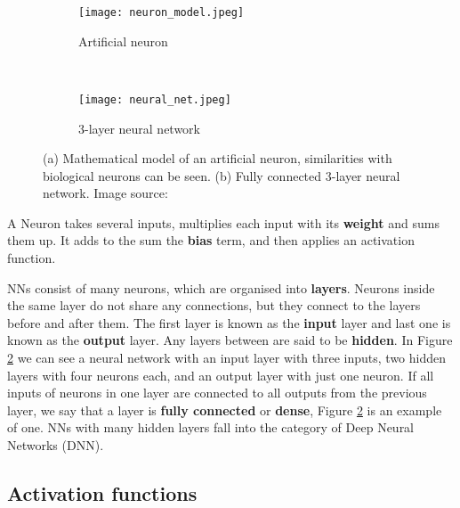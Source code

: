 \begin{figure}[ht] 
    \begin{subfigure}[b]{0.5\textwidth}
        \centering
        \texttt{[image: neuron\_model.jpeg]} 
        \caption{Artificial neuron}
        \label{neuron_model}
    \end{subfigure}
    \unskip\ \vrule\ 
    \begin{subfigure}[b]{0.5\textwidth}
        \centering
        \texttt{[image: neural\_net.jpeg]} 
        \caption{ 3-layer neural network}
        \label{neural_net}
    \end{subfigure}
    
    \caption[Mathematical model of artificial neuron and fully connected 3-layer neural network.]{(a) Mathematical model of an artificial neuron, similarities with biological neurons can be seen. (b) Fully connected 3-layer neural network. Image source: \cite{cs231n}}
    \label{neural}
\end{figure}

A Neuron takes several inputs, multiplies each input with its \textbf{weight} and sums them up.
It adds to the sum the \textbf{bias} term, and then applies an activation function.

NNs consist of many neurons, which are organised into \textbf{layers}.
Neurons inside the same layer do not share any connections, but they connect to the layers before and after them.
The first layer is known as the \textbf{input} layer and last one is known as the \textbf{output} layer. 
Any layers between are said to be \textbf{hidden}. 
In Figure \ref{neural_net} we can see a neural network with an input layer with three inputs, two hidden layers with four neurons each, and an output layer with just one neuron.
If all inputs of neurons in one layer are connected to all outputs from the previous layer, we say that a layer is \textbf{fully connected} or \textbf{dense}, Figure \ref{neural_net} is an example of one.
NNs with many hidden layers fall into the category of Deep Neural Networks (DNN).


\subsection{ Activation functions}

